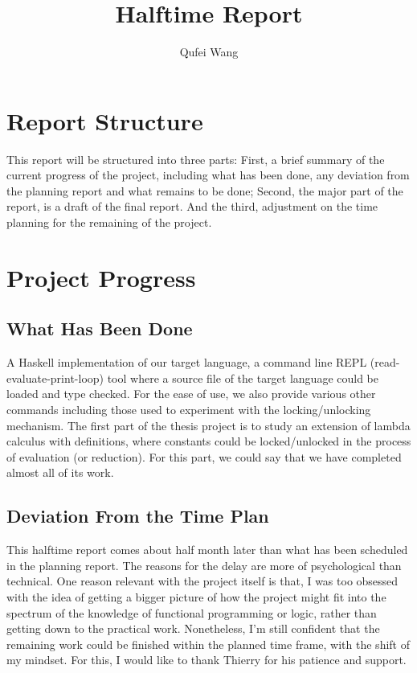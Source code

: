 \documentclass{article}
\theoremstyle{remark}
\begin{document}
\title{Halftime Report}
\author{Qufei Wang}
\maketitle

\tableofcontents

\clearpage

\section{Report Structure}
This report will be structured into three parts: First, a brief summary of the current progress of the project, including what has been done, any deviation from the planning report and what remains to be done; Second, the major part of the report, is a draft of the final report. And the third, adjustment on the time planning for the remaining of the project.

\section{Project Progress}
\subsection{What Has Been Done}
A Haskell implementation of our target language, a command line REPL (read-evaluate-print-loop) tool where a source file of the target language could be loaded and type checked. For the ease of use, we also provide various other commands including those used to experiment with the locking/unlocking mechanism. The first part of the thesis project is to study an extension of lambda calculus with definitions, where constants could be locked/unlocked in the process of evaluation (or reduction). For this part, we could say that we have completed almost all of its work.

\subsection{Deviation From the Time Plan}
This halftime report comes about half month later than what has been scheduled in the planning report. The reasons for the delay are more of psychological than technical. One reason relevant with the project itself is that, I was too obsessed with the idea of getting a bigger picture of how the project might fit into the spectrum of the knowledge of functional programming or logic, rather than getting down to the practical work. Nonetheless, I'm still confident that the remaining work could be finished within the planned time frame, with the shift of my mindset. For this, I would like to thank Thierry for his patience and support.
\end{document}
